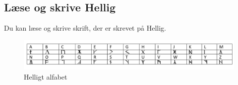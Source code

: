 \subsection*{Læse og skrive Hellig}
Du kan læse og skrive skrift, der er skrevet på Hellig.\\
\begin{figure}[H]
    \centering
    \includegraphics[width=1\textwidth]{setup/Alfabeter/Helligt alfabet.pdf}
    \caption{Helligt alfabet}
\end{figure}